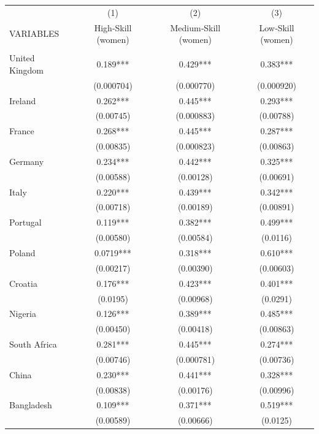 \documentclass[12pt, a4paper]{article}
\begin{document}
\begin{table}[H]
    \centering
        \begin{tabularx}{\textwidth}{@{}lCCC@{}} \hline
         & (1) & (2) & (3) \\
        VARIABLES & High‐Skill (women) & Medium‐Skill (women) & Low‐Skill (women) \\ \hline
         &  &  &  \\
        United Kingdom & 0.189*** & 0.429*** & 0.383*** \\
         & (0.000704) & (0.000770) & (0.000920) \\
        Ireland & 0.262*** & 0.445*** & 0.293*** \\
         & (0.00745) & (0.000883) & (0.00788) \\
        France & 0.268*** & 0.445*** & 0.287*** \\
         & (0.00835) & (0.000823) & (0.00863) \\
        Germany & 0.234*** & 0.442*** & 0.325*** \\
         & (0.00588) & (0.00128) & (0.00691) \\
        Italy & 0.220*** & 0.439*** & 0.342*** \\
         & (0.00718) & (0.00189) & (0.00891) \\
        Portugal & 0.119*** & 0.382*** & 0.499*** \\
         & (0.00580) & (0.00584) & (0.0116) \\
        Poland & 0.0719*** & 0.318*** & 0.610*** \\
         & (0.00217) & (0.00390) & (0.00603) \\
        Croatia & 0.176*** & 0.423*** & 0.401*** \\
         & (0.0195) & (0.00968) & (0.0291) \\
        Nigeria & 0.126*** & 0.389*** & 0.485*** \\
         & (0.00450) & (0.00418) & (0.00863) \\
        South Africa & 0.281*** & 0.445*** & 0.274*** \\
         & (0.00746) & (0.000781) & (0.00736) \\
        China & 0.230*** & 0.441*** & 0.328*** \\
         & (0.00838) & (0.00176) & (0.00996) \\
        Bangladesh & 0.109*** & 0.371*** & 0.519*** \\
         & (0.00589) & (0.00666) & (0.0125) \\

\end{tabularx}
\end{table}
\end{document}
